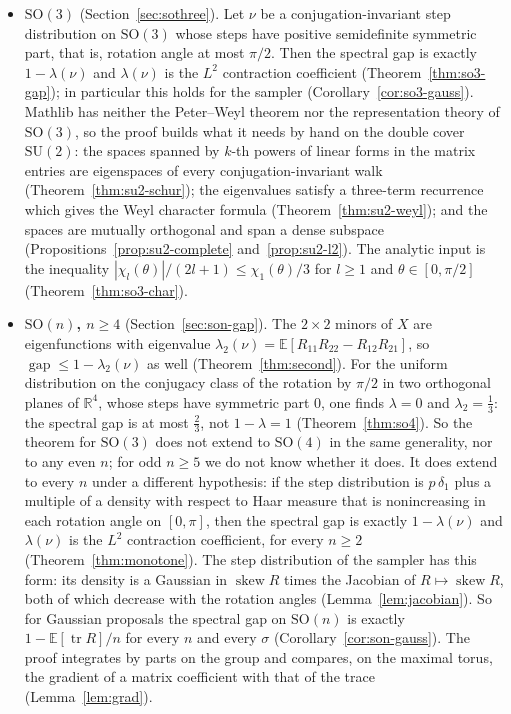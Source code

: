\documentclass[11pt]{amsart}
\theoremstyle{definition}
\theoremstyle{remark}
\newcommand{\R}{\mathbb{R}}
\newcommand{\E}{\mathbb{E}}
\newcommand{\SO}{\mathrm{SO}}
\newcommand{\tr}{\operatorname{tr}}
\newcommand{\skw}{\operatorname{skew}}
\newcommand{\gap}{\operatorname{gap}}
\begin{document}
\begin{itemize}
\item \textbf{$\SO(3)$} (Section~\ref{sec:sothree}).  Let $\nu$ be a conjugation-invariant step
distribution on $\SO(3)$ whose steps have positive semidefinite symmetric part, that is,
rotation angle at most $\pi/2$.  Then the spectral gap is exactly $1-\lambda(\nu)$ and
$\lambda(\nu)$ is the $L^2$ contraction coefficient (Theorem~\ref{thm:so3-gap}); in particular
this holds for the sampler (Corollary~\ref{cor:so3-gauss}).  Mathlib has neither the Peter--Weyl
theorem nor the representation theory of $\SO(3)$, so the proof builds what it needs by hand on
the double cover $\mathrm{SU}(2)$: the spaces spanned by $k$-th powers of linear forms in the
matrix entries are eigenspaces of every conjugation-invariant walk
(Theorem~\ref{thm:su2-schur}); the eigenvalues satisfy a three-term recurrence which gives the
Weyl character formula (Theorem~\ref{thm:su2-weyl}); and the spaces are mutually orthogonal and
span a dense subspace (Propositions~\ref{prop:su2-complete} and~\ref{prop:su2-l2}).  The analytic
input is the inequality $|\chi_l(\theta)|/(2l+1)\le\chi_1(\theta)/3$ for $l\ge 1$ and
$\theta\in[0,\pi/2]$ (Theorem~\ref{thm:so3-char}).

\item \textbf{$\SO(n)$, $n\ge4$} (Section~\ref{sec:son-gap}).  The $2\times2$ minors of $X$ are
eigenfunctions with eigenvalue $\lambda_2(\nu)=\E[R_{11}R_{22}-R_{12}R_{21}]$, so
$\gap\le1-\lambda_2(\nu)$ as well (Theorem~\ref{thm:second}).  For the uniform distribution on
the conjugacy class of the rotation by $\pi/2$ in two orthogonal planes of $\R^4$, whose steps
have symmetric part $0$, one finds $\lambda=0$ and $\lambda_2=\tfrac13$: the spectral gap is at
most $\tfrac23$, not $1-\lambda=1$ (Theorem~\ref{thm:so4}).  So the theorem for $\SO(3)$ does not
extend to $\SO(4)$ in the same generality, nor to any even $n$; for odd $n\ge5$ we do not know
whether it does.  It does extend to every $n$ under a different hypothesis: if the
step distribution is $p\,\delta_1$ plus a multiple of a density with respect to Haar measure that
is nonincreasing in each rotation angle on $[0,\pi]$, then the spectral gap is exactly
$1-\lambda(\nu)$ and $\lambda(\nu)$ is the $L^2$ contraction coefficient, for every $n\ge2$
(Theorem~\ref{thm:monotone}).  The step distribution of the sampler has this form: its density
is a Gaussian in $\skw R$ times the Jacobian of $R\mapsto\skw R$, both of which decrease with
the rotation angles (Lemma~\ref{lem:jacobian}).  So for Gaussian proposals the spectral gap on
$\SO(n)$ is exactly $1-\E[\tr R]/n$ for every $n$ and every $\sigma$
(Corollary~\ref{cor:son-gauss}).  The proof integrates by parts on the group and compares, on
the maximal torus, the gradient of a matrix coefficient with that of the trace
(Lemma~\ref{lem:grad}).
\end{itemize}
\end{document}
